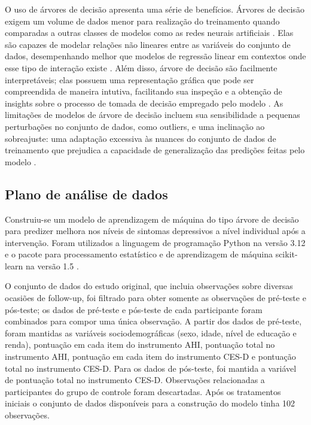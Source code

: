 O uso de árvores de decisão apresenta uma série de benefícios. Árvores de decisão exigem um volume de dados menor para realização do treinamento quando comparadas a outras classes
de modelos como as redes neurais artificiais \cite{Theobald2021}. Elas são capazes de modelar relações não lineares entre as variáveis do conjunto de dados, desempenhando melhor
que modelos de regressão linear em contextos onde esse tipo de interação existe \cite{Bi2019}. Além disso, árvore de decisão são facilmente interpretáveis; elas possuem uma representação
gráfica que pode ser compreendida de maneira intutiva, facilitando sua inspeção e a obtenção de insights sobre o processo de tomada de decisão empregado pelo modelo \cite{Bi2019}.
As limitações de modelos de árvore de decisão incluem sua sensibilidade a pequenas perturbações no conjunto de dados, como outliers, e uma inclinação ao sobreajuste: uma adaptação
excessiva às nuances do conjunto de dados de treinamento que prejudica a capacidade de generalização das predições feitas pelo modelo \cite{Bi2019}.

\subsection{Plano de análise de dados}

Construiu-se um modelo de aprendizagem de máquina do tipo árvore de decisão para predizer melhora nos níveis de sintomas depressivos a nível individual após a intervenção.
Foram utilizados a linguagem de programação Python na versão 3.12 \cite{Python} e o pacote para processamento estatístico e de aprendizagem de máquina scikit-learn na versão
1.5 \cite{ScikitLearn}.

O conjunto de dados do estudo original, que incluia observações sobre diversas ocasiões de follow-up, foi filtrado para obter somente as observações de pré-teste e pós-teste; os dados de
pré-teste e pós-teste de cada participante foram combinados para compor uma única observação. A partir dos dados de pré-teste, foram mantidas as variáveis sociodemográficas (sexo, idade,
nível de educação e renda), pontuação em cada item do instrumento AHI, pontuação total no instrumento AHI, pontuação em cada item do instrumento CES-D e pontuação total no instrumento CES-D.
Para os dados de pós-teste, foi mantida a variável de pontuação total no instrumento CES-D. Observações relacionadas a participantes do grupo de controle foram descartadas. Após os tratamentos
iniciais o conjunto de dados disponíveis para a construção do modelo tinha 102 observações.

